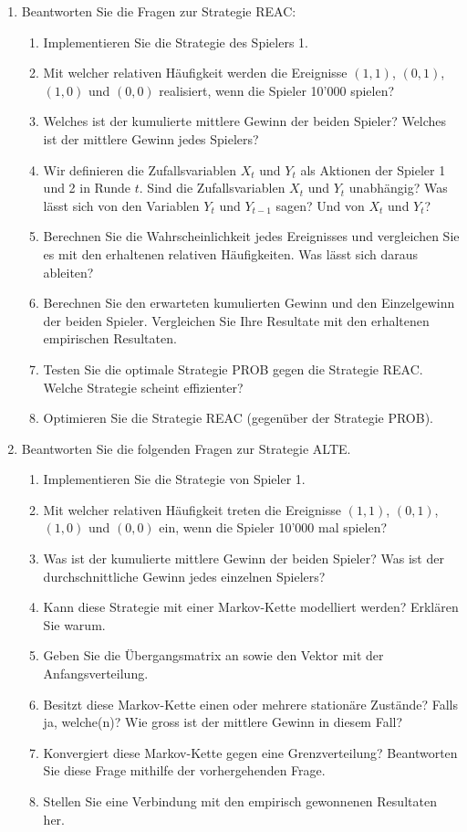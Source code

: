 \documentclass[12pt,a4paper]{article}
\begin{document}
\begin{enumerate}
\item Beantworten Sie die Fragen zur Strategie REAC: 
\begin{enumerate}
\item Implementieren Sie die Strategie des Spielers 1. 
\item Mit welcher relativen Häufigkeit werden die Ereignisse $(1, 1)$, $(0, 1)$, $(1, 0)$ und $(0, 0)$ realisiert, wenn die Spieler 10'000 spielen?
\item Welches ist der kumulierte mittlere Gewinn der beiden Spieler? Welches ist der mittlere Gewinn jedes Spielers? 
\item Wir definieren die Zufallsvariablen $X_t$ und $Y_t$ als Aktionen der Spieler 1 und 2 in Runde $t$. 
Sind die Zufallsvariablen $X_t$ und $Y_t$ unabhängig? Was lässt sich von den Variablen $Y_t$ und $Y_{t-1}$
sagen? Und von $X_t$ und $Y_t$? 
\item Berechnen Sie die Wahrscheinlichkeit jedes Ereignisses und vergleichen Sie es mit den erhaltenen relativen Häufigkeiten. Was lässt sich daraus ableiten?
\item Berechnen Sie den erwarteten kumulierten Gewinn und den Einzelgewinn der beiden Spieler. Vergleichen Sie Ihre Resultate mit den erhaltenen empirischen Resultaten.
\item Testen Sie die optimale Strategie PROB gegen die Strategie REAC. Welche Strategie scheint effizienter?
\item Optimieren Sie die Strategie REAC (gegenüber der Strategie PROB). 
\end{enumerate}

\item Beantworten Sie die folgenden Fragen zur Strategie ALTE.
\begin{enumerate}
\item Implementieren Sie die Strategie von Spieler 1. 
\item Mit welcher relativen Häufigkeit treten die Ereignisse $(1, 1)$, $(0, 1)$, $(1, 0)$ und $(0, 0)$ ein, 
wenn die Spieler 10'000 mal spielen?
\item Was ist der kumulierte mittlere Gewinn der beiden Spieler? Was ist der durchschnittliche Gewinn jedes einzelnen Spielers?
\item Kann diese Strategie mit einer Markov-Kette modelliert werden? Erklären Sie warum.
\item Geben Sie die Übergangsmatrix an sowie den Vektor mit der Anfangsverteilung. 
\item Besitzt diese Markov-Kette einen oder mehrere stationäre Zustände? Falls ja, welche(n)? Wie gross
ist der mittlere Gewinn in diesem Fall?
\item Konvergiert diese Markov-Kette gegen eine Grenzverteilung? Beantworten Sie diese
Frage mithilfe der vorhergehenden Frage. 
\item Stellen Sie eine Verbindung mit den empirisch gewonnenen Resultaten her. 
\end{enumerate}


\end{enumerate}
\end{document}
